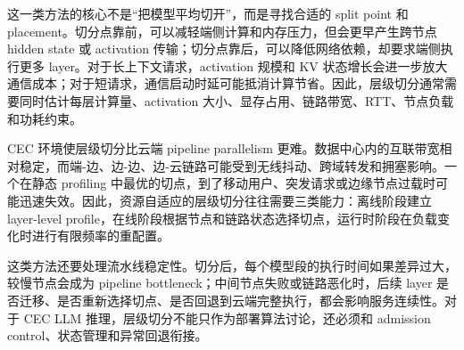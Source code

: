 \documentclass[a4paper,10pt]{ctexart}
\begin{document}
这一类方法的核心不是“把模型平均切开”，而是寻找合适的 split point 和 placement。切分点靠前，可以减轻端侧计算和内存压力，但会更早产生跨节点 hidden state 或 activation 传输；切分点靠后，可以降低网络依赖，却要求端侧执行更多 layer。对于长上下文请求，activation 规模和 KV 状态增长会进一步放大通信成本；对于短请求，通信启动时延可能抵消计算节省。因此，层级切分通常需要同时估计每层计算量、activation 大小、显存占用、链路带宽、RTT、节点负载和功耗约束。


CEC 环境使层级切分比云端 pipeline parallelism 更难。数据中心内的互联带宽相对稳定，而端-边、边-边、边-云链路可能受到无线抖动、跨域转发和拥塞影响。一个在静态 profiling 中最优的切点，到了移动用户、突发请求或边缘节点过载时可能迅速失效。因此，资源自适应的层级切分往往需要三类能力：离线阶段建立 layer-level profile，在线阶段根据节点和链路状态选择切点，运行时阶段在负载变化时进行有限频率的重配置。


这类方法还要处理流水线稳定性。切分后，每个模型段的执行时间如果差异过大，较慢节点会成为 pipeline bottleneck；中间节点失败或链路恶化时，后续 layer 是否迁移、是否重新选择切点、是否回退到云端完整执行，都会影响服务连续性。对于 CEC LLM 推理，层级切分不能只作为部署算法讨论，还必须和 admission control、状态管理和异常回退衔接。
\end{document}
